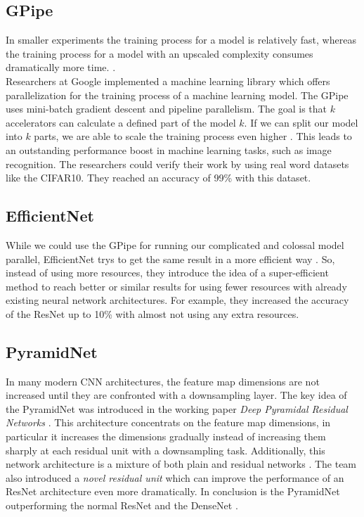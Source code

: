 \documentclass[journal]{IEEEtran}
\begin{document}
\subsection{GPipe}
In smaller experiments the training process for a model is relatively fast, whereas the training process for a model with an upscaled complexity consumes dramatically more time.
\cite{Yao2017ComplexityVP}.\\
Researchers at Google implemented a machine learning library which offers parallelization for the training process of a machine learning model. The GPipe uses mini-batch gradient descent and pipeline parallelism. The goal is that \(k\) accelerators can calculate a defined part of the model \(k\). If we can split our model into \(k\)  parts, we are able to scale the training process even higher \cite{GPipe}. This leads to an outstanding performance boost in machine learning tasks, such as image recognition\cite{perfGPipe}. The researchers could verify their work by using real word datasets like the CIFAR10. They reached an accuracy of 99\% \cite{GPipe} with this dataset. 
\subsection{EfficientNet}
While we could use the GPipe for running our complicated and colossal model parallel, EfficientNet trys to get the same result in a more efficient way\cite{EfficientNet} . So, instead of using more resources, they introduce the idea of a super-efficient method to reach better or similar results for using fewer resources with already existing neural network architectures\cite{EfficientNet}. For example, they increased the accuracy of the ResNet up to 10\% with almost not using any extra resources.
\subsection{PyramidNet}
In many modern CNN architectures, the feature map dimensions are not increased until they are confronted with a downsampling layer.
The key idea of the PyramidNet was introduced in the working paper \textit{Deep Pyramidal Residual Networks} \cite{lim2019fast}. This architecture concentrats on the feature
map dimensions, in particular it increases the dimensions gradually instead of increasing them sharply at each residual unit with a downsampling task. Additionally, this network architecture is a mixture of both plain and residual networks \cite{lim2019fast}. The team also introduced a \textit{novel residual unit} which can improve the performance of an ResNet architecture even more dramatically. 
In conclusion is the PyramidNet outperforming the normal ResNet and the DenseNet \cite{lim2019fast}.
%
%
\end{document}
